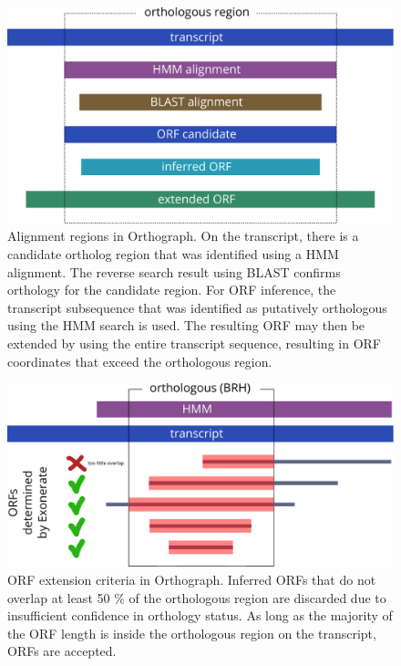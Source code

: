 \begin{figure}[htbp]
\centering
\includegraphics[width=\textwidth]{figures/alignment-regions.pdf}
\caption[Alignment regions in Orthograph]{Alignment regions in
Orthograph. On the transcript, there is a candidate ortholog region that
was identified using a HMM alignment. The reverse search result using
BLAST confirms orthology for the candidate region. For ORF inference,
the transcript subsequence that was identified as putatively orthologous
using the HMM search is used. The resulting ORF may then be extended by
using the entire transcript sequence, resulting in ORF coordinates that
exceed the orthologous region.}
\end{figure}

\begin{figure}[htbp]
\centering
\includegraphics[width=\textwidth]{figures/orf-overlap-minimum.pdf}
\caption[ORF extension criteria in Orthograph]{ORF extension criteria in
Orthograph. Inferred ORFs that do not overlap at least 50 \% of the
orthologous region are discarded due to insufficient confidence in
orthology status. As long as the majority of the ORF length is inside
the orthologous region on the transcript, ORFs are accepted.}
\end{figure}

